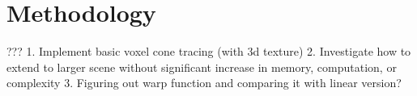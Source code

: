 \chapter{Methodology}

???
1. Implement basic voxel cone tracing (with 3d texture)
2. Investigate how to extend to larger scene without significant increase in memory, computation, or complexity
3. Figuring out warp function and comparing it with linear version?